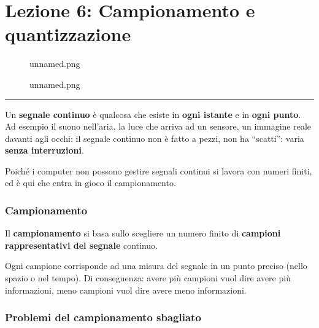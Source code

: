 \documentclass[
]{article}
\author{}
\date{}
\begin{document}
\hypertarget{lezione-6-campionamento-e-quantizzazione}{%
\section{Lezione 6: Campionamento e quantizzazione}\label{lezione-6-campionamento-e-quantizzazione}}

\begin{figure}
\centering
{unnamed.png}
\caption{unnamed.png}
\end{figure}

\begin{center}\rule{0.5\linewidth}{0.5pt}\end{center}

Un \textbf{segnale continuo} è qualcosa che esiste in \textbf{ogni istante} e in \textbf{ogni punto}.
Ad esempio il suono nell'aria, la luce che arriva ad un sensore, un immagine reale davanti agli occhi: il segnale continuo non è fatto a pezzi, non ha ``scatti'': varia \textbf{senza interruzioni}.

Poiché i computer non possono gestire segnali continui si lavora con numeri finiti, ed è qui che entra in gioco il campionamento.

\hypertarget{campionamento}{%
\subsubsection{Campionamento}\label{campionamento}}

Il \textbf{campionamento} si basa sullo scegliere un numero finito di \textbf{campioni rappresentativi del segnale} continuo.

Ogni campione corrisponde ad una misura del segnale in un punto preciso (nello spazio o nel tempo).
Di conseguenza: avere più campioni vuol dire avere più informazioni, meno campioni vuol dire avere meno informazioni.

\hypertarget{problemi-del-campionamento-sbagliato}{%
\subsubsection{Problemi del campionamento sbagliato}\label{problemi-del-campionamento-sbagliato}}
\end{document}

